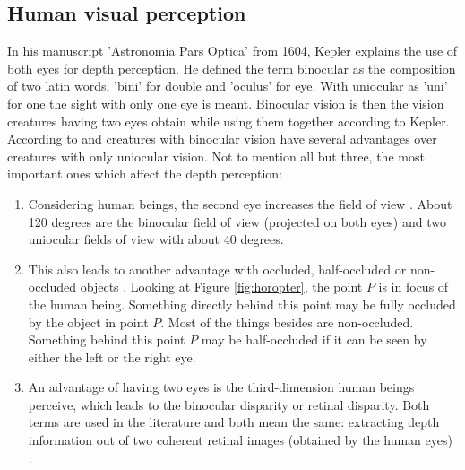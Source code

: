 \newpage

\subsection*{Human visual perception}

In his manuscript 'Astronomia Pars Optica' from 1604, Kepler explains the use of both eyes for depth perception.
He defined the term binocular as the composition of two latin words, 'bini' for double and 'oculus' for eye.
With uniocular as 'uni' for one the sight with only one eye is meant.
Binocular vision is then the vision creatures having two eyes obtain while using them together according to Kepler.
According to \citeauthor{fahle1987wozu} \citep{fahle1987wozu} and \citeauthor{henson2000visual} \citep{henson2000visual} creatures with binocular vision have several advantages over creatures with only uniocular vision.
Not to mention all but three, the most important ones which affect the depth perception:

\begin{enumerate}
  \item Considering human beings, the second eye increases the field of view \citep{henson2000visual}. About 120 degrees are the binocular field of view (projected on both eyes) and two uniocular fields of view with about 40 degrees.
  \item This also leads to another advantage with occluded, half-occluded or non-occluded objects \citep{fahle1987wozu}. Looking at Figure \ref{fig:horopter}, the point $P$ is in focus of the human being. Something directly behind this point may be fully occluded by the object in point $P$. Most of the things besides are non-occluded. Something behind this point $P$ may be half-occluded if it can be seen by either the left or the right eye.
  \item An advantage of having two eyes is the third-dimension human beings perceive, which leads to the binocular disparity or retinal disparity. Both terms are used in the literature and both mean the same: extracting depth information out of two coherent retinal images (obtained by the human eyes) \citep{cyganek2011introduction, fahle1987wozu}.
\end{enumerate}

